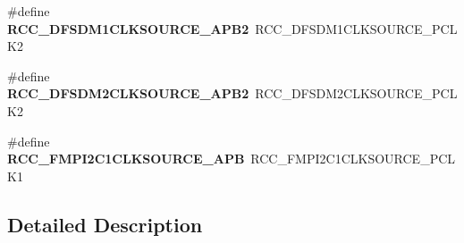 \begin{DoxyCompactItemize}
\item 
\mbox{\label{group___h_a_l___r_c_c___aliased_ga7df532f529d9a68b1a9826b96875fc35}} 
\#define {\bfseries R\+C\+C\+\_\+\+D\+F\+S\+D\+M1\+C\+L\+K\+S\+O\+U\+R\+C\+E\+\_\+\+A\+P\+B2}~R\+C\+C\+\_\+\+D\+F\+S\+D\+M1\+C\+L\+K\+S\+O\+U\+R\+C\+E\+\_\+\+P\+C\+L\+K2
\item 
\mbox{\label{group___h_a_l___r_c_c___aliased_ga8d2ed8eb855d6ee1b6b36331192e2fd0}} 
\#define {\bfseries R\+C\+C\+\_\+\+D\+F\+S\+D\+M2\+C\+L\+K\+S\+O\+U\+R\+C\+E\+\_\+\+A\+P\+B2}~R\+C\+C\+\_\+\+D\+F\+S\+D\+M2\+C\+L\+K\+S\+O\+U\+R\+C\+E\+\_\+\+P\+C\+L\+K2
\item 
\mbox{\label{group___h_a_l___r_c_c___aliased_ga70931272f9ab715e045f7c453088839f}} 
\#define {\bfseries R\+C\+C\+\_\+\+F\+M\+P\+I2\+C1\+C\+L\+K\+S\+O\+U\+R\+C\+E\+\_\+\+A\+PB}~R\+C\+C\+\_\+\+F\+M\+P\+I2\+C1\+C\+L\+K\+S\+O\+U\+R\+C\+E\+\_\+\+P\+C\+L\+K1
\end{DoxyCompactItemize}


\subsection{Detailed Description}
